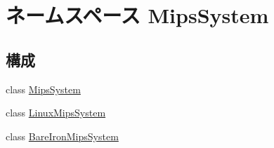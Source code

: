 \hypertarget{namespaceMipsSystem}{
\section{ネームスペース MipsSystem}
\label{namespaceMipsSystem}
}
\subsection*{構成}
\begin{DoxyCompactItemize}
\item 
class \hyperlink{classMipsSystem_1_1MipsSystem}{MipsSystem}
\item 
class \hyperlink{classMipsSystem_1_1LinuxMipsSystem}{LinuxMipsSystem}
\item 
class \hyperlink{classMipsSystem_1_1BareIronMipsSystem}{BareIronMipsSystem}
\end{DoxyCompactItemize}

